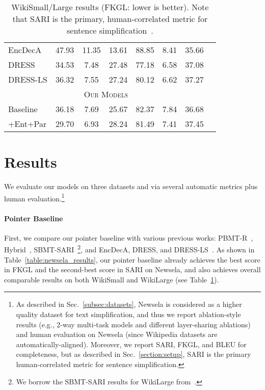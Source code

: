 \documentclass[11pt]{article}
\begin{document}
\begin{table}[t]
\begin{minipage}[t]{.595\linewidth}
\begin{center}
\begin{small}
\begin{tabular}{|l|c|c|c|c|c|c|c|}
EncDecA  & 47.93 & 11.35 & 13.61 & 88.85 & 8.41 & 35.66 \\
DRESS  & 34.53 & 7.48 & 27.48 & 77.18 & 6.58 & 37.08 \\
DRESS-LS  & 36.32 & 7.55 & 27.24 & 80.12 & 6.62 & 37.27 \\
\hline
\multicolumn{7}{|c|}{\textsc{Our Models}}\\
\hline
Baseline   & 36.18 & 7.69 & 25.67 & 82.37 & 7.84 & 36.68 \\
+Ent+Par  & 29.70 & 6.93 & 28.24 & 81.49 & 7.41 & 37.45 \\
\hline
\end{tabular}
\end{small}
\end{center}
\vspace{-8pt}
\caption{WikiSmall/Large results (FKGL: lower is better). Note that SARI is the primary, human-correlated metric for sentence simplification~\cite{Xu2016OptimizingSM}.
}
\label{table:wikilarge_results}
\end{minipage}
\vspace{-5pt}
\end{table}


\section{Results}
\label{label:results}
We evaluate our models on three datasets and via several automatic metrics plus human evaluation.\footnote{As described in Sec.~\ref{subsec:datasets}, Newsela is considered as a higher quality dataset for text simplification, and thus we report ablation-style results (e.g., 2-way multi-task models and different layer-sharing ablations) and human evaluation on Newsela (since Wikipedia datasets are automatically-aligned). Moreover, we report SARI, FKGL, and BLEU for completeness, but as described in Sec.~\ref{section:setup}, SARI is the primary human-correlated metric for sentence simplification.} 

\paragraph{Pointer Baseline}
First, we compare our pointer baseline with various previous works: PBMT-R~\cite{Wubben2012SentenceSB}, Hybrid~\cite{Narayan2014HybridSU}, SBMT-SARI~\cite{Xu2016OptimizingSM}\footnote{We borrow the SBMT-SARI results for WikiLarge from~.}, and EncDecA, DRESS, and DRESS-LS~\cite{zhang2017dress}. As shown in Table~\ref{table:newsela_results}, our pointer baseline already achieves the best score in FKGL and the second-best score in SARI on Newsela, and also achieves overall comparable results on both WikiSmall and WikiLarge (see Table~\ref{table:wikilarge_results}).
\end{document}
